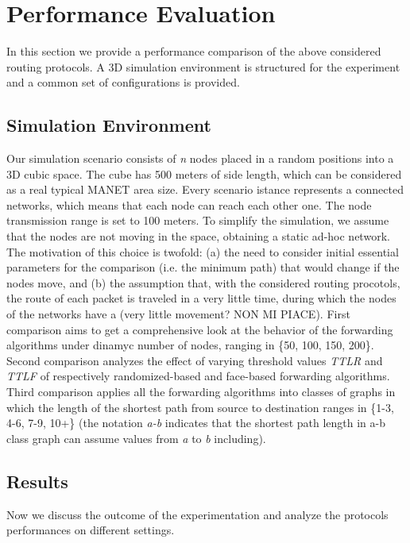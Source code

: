 \documentclass[journal,comsoc]{IEEEtran}
\begin{document}
\section{Performance Evaluation}
In this section we provide a performance comparison of the above considered routing protocols. A 3D simulation environment is structured for the experiment and a common set of configurations is provided.

\subsection{Simulation Environment}
Our simulation scenario consists of \textit{n} nodes placed in a random positions into a 3D cubic space. The cube has 500 meters of side length, which can be considered as a real typical MANET area size. Every scenario istance represents a connected networks, which means that each node can reach each other one. The node transmission range is set to 100 meters. To simplify the simulation, we assume that the nodes are not moving in the space, obtaining a static ad-hoc network. The motivation of this choice is twofold: (a) the need to consider initial essential parameters for the comparison (i.e. the minimum path) that would change if the nodes move, and (b) the assumption that, with the considered routing procotols, the route of each packet is traveled in a very little time, during which the nodes of the networks have a (very little movement? NON MI PIACE). First comparison aims to get a comprehensive look at the behavior of the forwarding algorithms under dinamyc number of nodes, ranging in \{50, 100, 150, 200\}. Second comparison analyzes the effect of varying threshold values \emph{TTLR} and \emph{TTLF} of respectively randomized-based and face-based forwarding algorithms. Third comparison applies all the forwarding algorithms into classes of graphs in which the length of the shortest path from source to destination ranges in \{1-3, 4-6, 7-9, 10+\} (the notation \emph{a-b} indicates that the shortest path length in a-b class graph can assume values from \emph{a} to \emph{b} including).

\subsection{Results}
Now we discuss the outcome of the experimentation and analyze the protocols performances on different settings.
\end{document}
